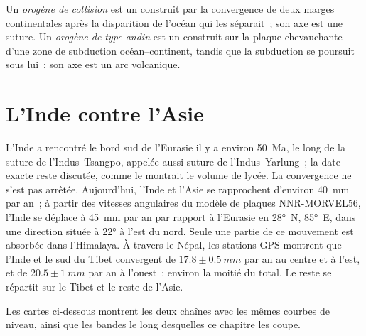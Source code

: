 \begin{definition}\label{def:b2:himalaya-andes:types}
Un \emph{orogène de collision} est un  construit par
la convergence de deux marges continentales après la disparition de l'océan qui les séparait~;
son axe est une suture. Un \emph{orogène de type andin}
est un  construit sur la plaque chevauchante d'une zone de subduction
océan--continent, tandis que la subduction se poursuit sous lui~; son axe est un arc volcanique.
\end{definition}


\section{L'Inde contre l'Asie}\label{sec:b2:himalaya-andes:himalaya}

L'Inde a rencontré le bord sud de l'Eurasie il y a environ \qty{50}{Ma}, le long de la suture de
l'Indus--Tsangpo, appelée aussi suture de l'Indus--Yarlung~; la date exacte reste discutée, comme le
montrait le volume de lycée. La convergence ne s'est pas arrêtée. Aujourd'hui, l'Inde et l'Asie se
rapprochent d'environ \qty{40}{mm} par an~; à partir des vitesses angulaires du modèle de plaques
NNR-MORVEL56, l'Inde se déplace à \qty{45}{mm} par an par rapport à l'Eurasie en \ang{28}~N, \ang{85}~E,
dans une direction située à \ang{22} à l'est du nord. Seule une partie de ce mouvement est absorbée
dans l'Himalaya. À travers le Népal, les stations GPS montrent que l'Inde et le sud du Tibet
convergent de $17.8 \pm \qty{0.5}{mm}$ par an au centre et à l'est, et de $20.5 \pm \qty{1}{mm}$ par
an à l'ouest~: environ la moitié du total. Le reste se répartit sur le Tibet et le reste de l'Asie.

Les cartes ci-dessous montrent les deux chaînes avec les mêmes courbes de
niveau, ainsi que les bandes le long desquelles ce chapitre les coupe.

